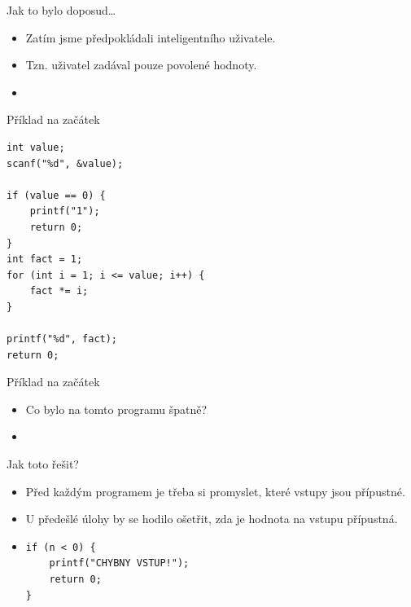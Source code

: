 \documentclass[14pt,aspectratio=169]{beamer}
\begin{document}

    \begin{frame}
        \titlepage
    \end{frame}

    \begin{frame}[t,fragile]{Jak to bylo doposud\dots}
        \begin{itemize}
            \item Zatím jsme předpokládali inteligentního uživatele.
            \item Tzn. uživatel zadával pouze povolené hodnoty.
            \item {}
        \end{itemize}
    \end{frame}

    \begin{frame}[t,fragile]{Příklad na začátek}
        \begin{lstlisting}
int value;
scanf("%d", &value);

if (value == 0) {
    printf("1");
    return 0;
}
int fact = 1;
for (int i = 1; i <= value; i++) {
    fact *= i;
}

printf("%d", fact);
return 0;
        \end{lstlisting}
    \end{frame}

    \begin{frame}[t]{Příklad na začátek}
        \begin{itemize}
            \item Co bylo na tomto programu špatně?
            \item {}
        \end{itemize}
    \end{frame}

    \begin{frame}[t,fragile]{Jak toto řešit?}
        \begin{itemize}
            \item Před každým programem je třeba si promyslet, které vstupy jsou přípustné.
            \item U předešlé úlohy by se hodilo ošetřit, zda je hodnota na vstupu přípustná.
            \item {}
            \begin{lstlisting}
if (n < 0) {
    printf("CHYBNY VSTUP!");
    return 0;
}
            \end{lstlisting}
        \end{itemize}
    \end{frame}
\end{document}
